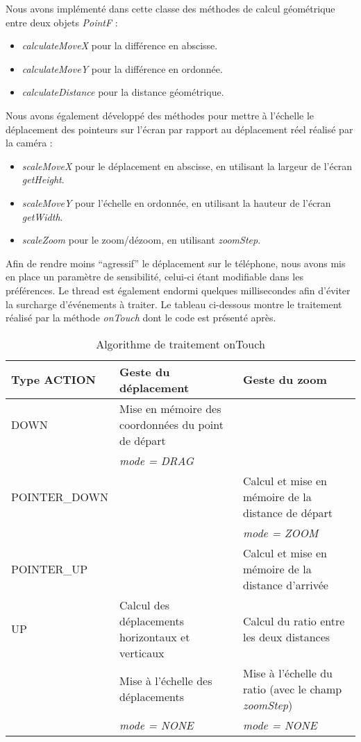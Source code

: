 Nous avons implémenté dans cette classe des méthodes de calcul géométrique entre deux objets \textit{PointF} :
\begin{itemize}
	\item \textit{calculateMoveX} pour la différence en abscisse.
	\item \textit{calculateMoveY} pour la différence en ordonnée.
	\item \textit{calculateDistance} pour la distance géométrique.
\end{itemize}

Nous avons également développé des méthodes pour mettre à l'échelle le déplacement des pointeurs sur l'écran par rapport au déplacement réel réalisé par la caméra :
\begin{itemize}
	\item \textit{scaleMoveX} pour le déplacement en abscisse, en utilisant la
	largeur de l'écran \textit{getHeight}.
	\item \textit{scaleMoveY} pour l'échelle en ordonnée, en utilisant la hauteur
	de l'écran \textit{getWidth}.
	\item \textit{scaleZoom} pour le zoom/dézoom, en utilisant \textit{zoomStep}.
\end{itemize}

Afin de rendre moins ``agressif'' le déplacement sur le téléphone, nous avons
mis en place un paramètre de sensibilité, celui-ci étant modifiable dans les préférences.
Le thread est également endormi quelques millisecondes afin d'éviter la
surcharge d'événements à traiter.
Le tableau ci-dessous montre le traitement
réalisé par la méthode \textit{onTouch} dont le code est présenté après.\newline
\begin{table}[H]
\centering
\begin{tabular}{|p{0.2\linewidth}|p{0.4\linewidth}| p{0.4\linewidth}|}
\hline
Type ACTION & Geste du déplacement & Geste du zoom \\
\hline
DOWN & Mise en mémoire des coordonnées du point de départ &  \\
 & \textit{mode = DRAG} & \\
POINTER\_DOWN & & Calcul et mise en mémoire de la distance de départ \\
 & & \textit{mode = ZOOM} \\
POINTER\_UP & & Calcul et mise en mémoire de la distance d'arrivée \\
UP & Calcul des déplacements horizontaux et verticaux & Calcul du ratio entre les deux distances \\
 & Mise à l'échelle des déplacements & Mise à l'échelle du ratio (avec le champ \textit{zoomStep}) \\
 & \textit{mode = NONE} & \textit{mode = NONE} \\
\hline
\end{tabular}
\caption{Algorithme de traitement onTouch}
\end{table}

